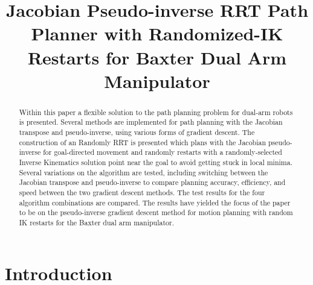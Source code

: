 \documentclass[conference]{IEEEtran} \usepackage[T1]{fontenc} \usepackage[backend=biber, style=ieee]{biblatex}
\begin{document}
\title{Jacobian Pseudo-inverse RRT Path Planner with Randomized-IK Restarts for Baxter Dual Arm Manipulator}

\author{
}

\maketitle

\begin{abstract}
Within this paper a flexible solution to the path planning problem for dual-arm robots is presented. Several methods are implemented for path planning with the 
Jacobian transpose and pseudo-inverse, using various forms of gradient descent. The construction of an Randomly RRT is presented which plans with the Jacobian 
pseudo-inverse for goal-directed movement and randomly restarts with a randomly-selected Inverse Kinematics solution point near the goal to avoid getting stuck 
in local minima. Several variations on the algorithm are tested, including switching between the Jacobian transpose and pseudo-inverse to compare planning 
accuracy, efficiency, and speed between the two gradient descent methods. The test results for the four algorithm combinations are compared. The results have 
yielded the focus of the paper to be on the pseudo-inverse gradient descent method for motion planning with random IK restarts for the Baxter dual arm 
manipulator.
\end{abstract}

\section{Introduction} \label{Introduction}
\end{document}
